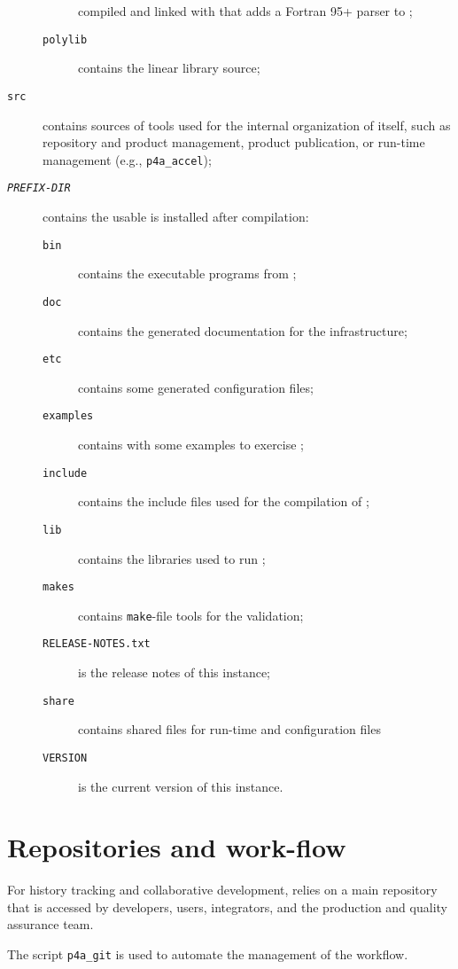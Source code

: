 \documentclass[a4paper]{article}
\begin{document}
\begin{description}
\begin{description}
    compiled and linked with \Apips that adds a Fortran 95+ parser to \Apips;
  \item[\texttt{polylib}] contains the \Apolylib linear library source;
  \end{description}
\item[\texttt{src}] contains sources of tools used for the internal
  organization of \Apfa itself, such as repository and product management,
  product publication, or run-time management (e.g., \verb|p4a_accel|);
\item[\texttt{\emph{PREFIX-DIR}}] contains the usable \Apfa is installed
  after compilation:
  \begin{description}
  \item[\texttt{bin}] contains the executable programs from \Apfa;
  \item[\texttt{doc}] contains the generated documentation for the \Apfa
    infrastructure;
  \item[\texttt{etc}] contains some generated configuration files;
  \item[\texttt{examples}] contains with some examples to exercise \Apfa;
  \item[\texttt{include}] contains the include files used for the
    compilation of \Apfa;
  \item[\texttt{lib}] contains the libraries used to run \Apfa;
  \item[\texttt{makes}] contains \texttt{make}-file tools for the
    \Apips validation;
  \item[\texttt{RELEASE-NOTES.txt}] is the release notes of this \Apfa
    instance;
  \item[\texttt{share}] contains shared files for run-time and
    configuration files
  \item[\texttt{VERSION}] is the current version of this \Apfa
    instance.
  \end{description}
\end{description}


\section{Repositories and work-flow}
\label{sec:repos-workfl}

For history tracking and collaborative development, \Apfa relies on a main
\Agit repository that is accessed by \Apfa developers, users, integrators,
and the production and quality assurance team.

The script \verb|p4a_git| is used to automate the management of the
workflow.
\end{document}
